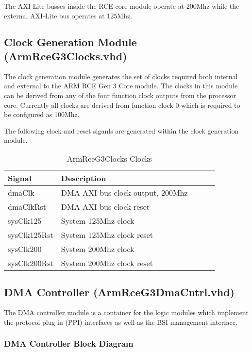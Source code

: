 \documentclass[11pt]{article}
\begin{document}
The AXI-Lite busses inside the RCE core module operate at 200Mhz while the external AXI-Lite bus operates at 125Mhz.

\subsection{Clock Generation Module (ArmRceG3Clocks.vhd)}
\label{subsec:ArmRceG3Clocks}

The clock generation module generates the set of clocks required both internal and external to
the ARM RCE Gen 3 Core module. The clocks in this module can be derived from any of the four function 
clock outputs from the processor core. Currently all clocks are derived from function clock 0 which is
required to be configured as 100Mhz.

The following clock and reset siganls are generated within the clock generation module.

\begin{table}[H]
\small
\centering
   \begin{tabular}{| l | l | l | l | l | } 
      \hline \textbf{Signal} & \textbf{Description} \\
      \hline dmaClk          & DMA AXI bus clock output, 200Mhz   \\
      \hline dmaClkRst       & DMA AXI bus clock reset            \\
      \hline sysClk125       & System 125Mhz clock                \\
      \hline sysClk125Rst    & System 125Mhz clock reset          \\
      \hline sysClk200       & System 200Mhz clock                \\
      \hline sysClk200Rst    & System 200Mhz clock reset          \\
      \hline
   \end{tabular}
   \caption{ArmRceG3Clocks Clocks}
   \label{tab:clk_gen_clocks}
\end{table}

\subsection{DMA Controller (ArmRceG3DmaCntrl.vhd)}
\label{subsec:ArmRceG3DmaCntrl}

The DMA controller module is a container for the logic modules which implement the protocol plug in (PPI) interfaces as well
as the BSI management interface. 

\subsubsection{DMA Controller Block Diagram}
\end{document}
